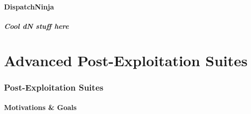 \documentclass{beamer}
\begin{document}
    \subsection{DispatchNinja}
\begin{frame}[t]
    \frametitle{Cool dN stuff here}
\end{frame}

\part{Advanced Post-Exploitation Suites}

\section{Post-Exploitation Suites}
    \subsection{Motivations \& Goals}
\end{document}
